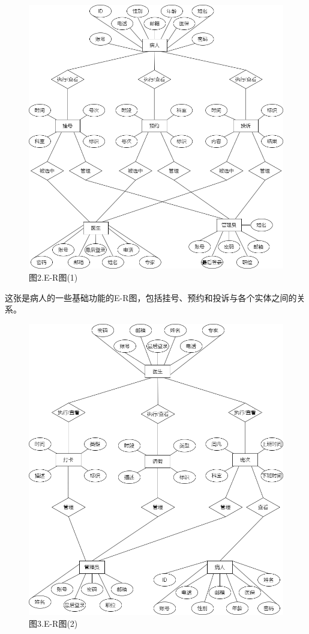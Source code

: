 \documentclass[24pt,a4paper]{article}%
\begin{document}
\begin{figure}[H]
    \centering
    \includegraphics[width=1\textwidth]{image/E-R图(1).png}
    \caption*{图2.E-R图(1)}
\end{figure}
这张是病人的一些基础功能的E-R图，包括挂号、预约和投诉与各个实体之间的关系。
\begin{figure}[H]
    \centering
    \includegraphics[width=1\textwidth]{image/E-R图(2).png}
    \caption*{图3.E-R图(2)}
\end{figure}
\end{document}
